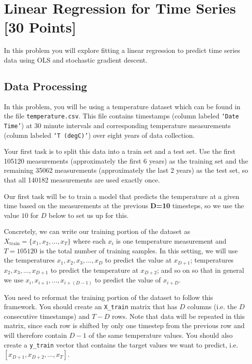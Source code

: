 \section{Linear Regression for Time Series [30 Points]}

In this problem you will explore fitting a linear regression to predict time series data using OLS and stochastic gradient descent.

\subsection{Data Processing}

In this problem, you will be using a temperature dataset which can be found in the file \texttt{temperature.csv}. This file contains timestamps (column labeled \texttt{`Date Time'}) at 30 minute intervals and corresponding temperature measurements (column labeled \texttt{`T (degC)'}) over eight years of data collection. 

Your first task is to split this data into a train set and a test set. Use the first 105120 measurements (approximately the first 6 years) as the training set and the remaining 35062 measurements (approximately the last 2 years) as the test set, so that all 140182 measurements are used exactly once.

Our first task will be to train a model that predicts the temperature at a given time based on the measurements at the previous \textbf{D=10} timesteps, so we use the value $10$ for $D$ below to set us up for this.

Concretely, we can write our training portion of the dataset as $X_{\mathrm{train}} = \{x_1, x_2, ... ,x_T \}$ where each $x_i$ is one temperature measurement and $T = 105120$ is the total number of training samples. 
In this setting, we will use the temperatures $x_1, x_2, x_3, ..., x_D$ to predict the value at $x_{D+1}$; temperatures $x_2, x_3, ..., x_{D+1}$ to predict the temperature at $x_{D+2}$; and so on so that in general we use $x_i, x_{i+1}, ..., x_{i+(D-1)}$ to predict the value of $x_{i+D}$.

You need to reformat the training portion of the dataset to follow this framework. You should create an \texttt{X\_train} matrix that has $D$ columns (i.e. the $D$ consecutive timestamps) and $T-D$ rows. Note that data will be repeated in this matrix, since each row is shifted by only one timestep from the previous row and will therefore contain $D-1$ of the same temperature values. You should also create a \texttt{y\_train} vector that contains the target values we want to predict, i.e. $[x_{D+1}, x_{D+2}, ..., x_T]$.

